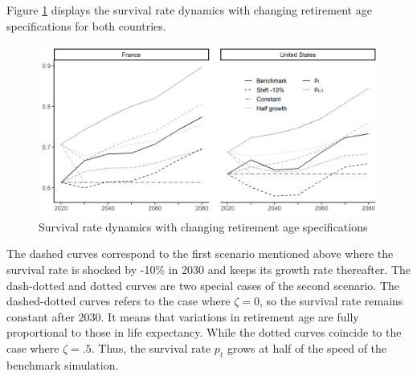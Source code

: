 Figure \ref{fig:retage_p} displays the survival rate dynamics with changing retirement age specifications for both countries.
\begin{figure}[tb]
	\centering
	\includegraphics[width=1\linewidth]{../result/retirement/retage_p.png}
	\caption{Survival rate dynamics with changing retirement age specifications}
	\label{fig:retage_p}
\end{figure}
The dashed curves correspond to the first scenario mentioned above where the survival rate is shocked by -10\% in 2030 and keeps its growth rate thereafter. The dash-dotted and dotted curves are two special cases of the second scenario. The dashed-dotted curves refers to the case where $\zeta = 0$, so the survival rate remains constant after 2030. It means that variations in retirement age are fully proportional to those in life expectancy. While the dotted curves coincide to the case where $\zeta = .5$. Thus, the survival rate $p_t$ grows at half of the speed of the benchmark simulation.

